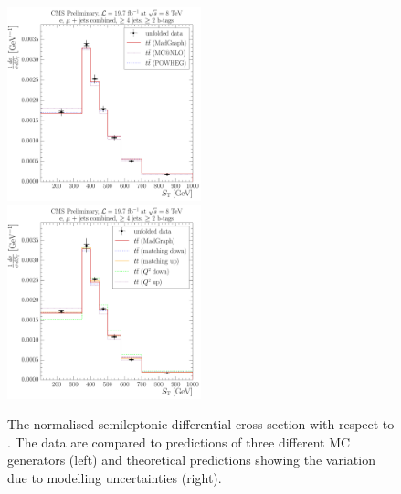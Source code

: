 \begin{figure}[!htbp]
	\centering
  	{\includegraphics[width=0.5\textwidth]{measurement/ST/central/normalised_xsection_combined_different_generators}}\hfill
  	{\includegraphics[width=0.5\textwidth]{measurement/ST/central/normalised_xsection_combined_systematics_shifts}}
    \caption[The normalised semileptonic \ttbar differential cross section with respect to \ST.]{The normalised
      semileptonic \ttbar differential cross section with respect to \ST. The data are compared to predictions of three
      different MC generators (left) and theoretical predictions showing the variation due to modelling uncertainties
      (right).}
    \label{fig:results_ST_combined}
\end{figure}

